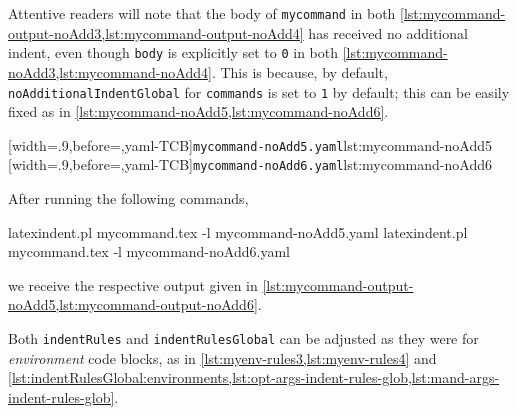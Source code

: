  \begin{example}
 Attentive readers will note that the body of \texttt{mycommand} in both
 \cref{lst:mycommand-output-noAdd3,lst:mycommand-output-noAdd4} has received no
 additional indent, even though \texttt{body} is explicitly set to \texttt{0} in both
 \cref{lst:mycommand-noAdd3,lst:mycommand-noAdd4}. This is because, by default,
 \texttt{noAdditionalIndentGlobal} for \texttt{commands} is set to \texttt{1} by default;
 this can be easily fixed as in
 \cref{lst:mycommand-noAdd5,lst:mycommand-noAdd6}.\label{page:command:noAddGlobal}

 \begin{cmhtcbraster}
  [width=.9\linewidth,before=\centering,yaml-TCB]{\texttt{mycommand-noAdd5.yaml}}{lst:mycommand-noAdd5}
  [width=.9\linewidth,before=\centering,yaml-TCB]{\texttt{mycommand-noAdd6.yaml}}{lst:mycommand-noAdd6}
 \end{cmhtcbraster}

 After running the following commands, 

 \begin{commandshell}
latexindent.pl mycommand.tex -l mycommand-noAdd5.yaml  
latexindent.pl mycommand.tex -l mycommand-noAdd6.yaml  
\end{commandshell}

 we receive the respective output given in
 \cref{lst:mycommand-output-noAdd5,lst:mycommand-output-noAdd6}.

 \begin{cmhtcbraster}
 \end{cmhtcbraster}
 \end{example}

 Both \texttt{indentRules} and \texttt{indentRulesGlobal} can be adjusted as they were
 for \emph{environment} code blocks, as in \vref{lst:myenv-rules3,lst:myenv-rules4} and
 \vref{lst:indentRulesGlobal:environments,lst:opt-args-indent-rules-glob,lst:mand-args-indent-rules-glob}.
